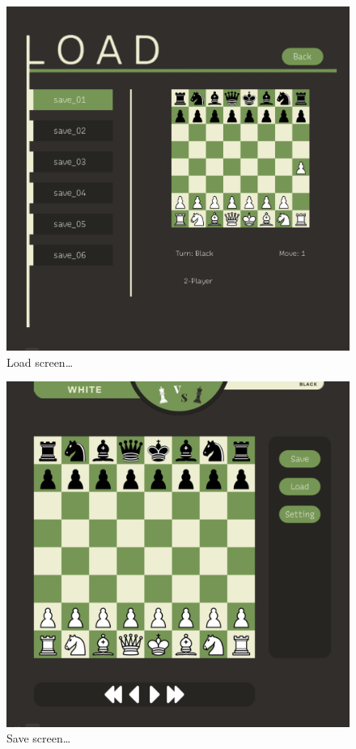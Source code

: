 \documentclass[a4paper, 10pt, titlepage]{report}
\begin{document}
  \begin{figure}%
    \includegraphics[width=\linewidth]{load_screen.png}
    \caption{Load screen\dots}
    \label{fig:third}
  \end{figure}%
  \hfill

  \begin{figure}%
    \includegraphics[width=\linewidth]{game_screen.png}
    \caption{Save screen\dots}
    \label{fig:fourth}
  \end{figure}%
  \hfill \break
\end{document}
